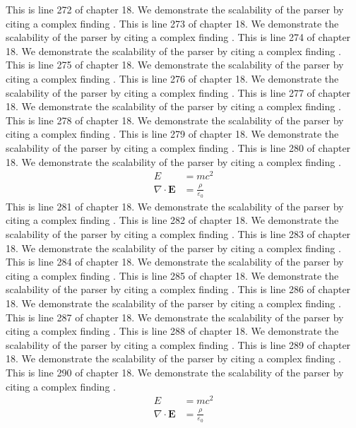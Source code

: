 This is line 272 of chapter 18. We demonstrate the scalability of the parser by citing a complex finding \cite{ref18_272}.
This is line 273 of chapter 18. We demonstrate the scalability of the parser by citing a complex finding \cite{ref18_273}.
This is line 274 of chapter 18. We demonstrate the scalability of the parser by citing a complex finding \cite{ref18_274}.
This is line 275 of chapter 18. We demonstrate the scalability of the parser by citing a complex finding \cite{ref18_275}.
This is line 276 of chapter 18. We demonstrate the scalability of the parser by citing a complex finding \cite{ref18_276}.
This is line 277 of chapter 18. We demonstrate the scalability of the parser by citing a complex finding \cite{ref18_277}.
This is line 278 of chapter 18. We demonstrate the scalability of the parser by citing a complex finding \cite{ref18_278}.
This is line 279 of chapter 18. We demonstrate the scalability of the parser by citing a complex finding \cite{ref18_279}.
This is line 280 of chapter 18. We demonstrate the scalability of the parser by citing a complex finding \cite{ref18_280}.
\begin{align*}
  E &= mc^2 \\
  \nabla \cdot \mathbf{E} &= \frac{\rho}{\varepsilon_0}
\end{align*}
This is line 281 of chapter 18. We demonstrate the scalability of the parser by citing a complex finding \cite{ref18_281}.
This is line 282 of chapter 18. We demonstrate the scalability of the parser by citing a complex finding \cite{ref18_282}.
This is line 283 of chapter 18. We demonstrate the scalability of the parser by citing a complex finding \cite{ref18_283}.
This is line 284 of chapter 18. We demonstrate the scalability of the parser by citing a complex finding \cite{ref18_284}.
This is line 285 of chapter 18. We demonstrate the scalability of the parser by citing a complex finding \cite{ref18_285}.
This is line 286 of chapter 18. We demonstrate the scalability of the parser by citing a complex finding \cite{ref18_286}.
This is line 287 of chapter 18. We demonstrate the scalability of the parser by citing a complex finding \cite{ref18_287}.
This is line 288 of chapter 18. We demonstrate the scalability of the parser by citing a complex finding \cite{ref18_288}.
This is line 289 of chapter 18. We demonstrate the scalability of the parser by citing a complex finding \cite{ref18_289}.
This is line 290 of chapter 18. We demonstrate the scalability of the parser by citing a complex finding \cite{ref18_290}.
\begin{align*}
  E &= mc^2 \\
  \nabla \cdot \mathbf{E} &= \frac{\rho}{\varepsilon_0}
\end{align*}
